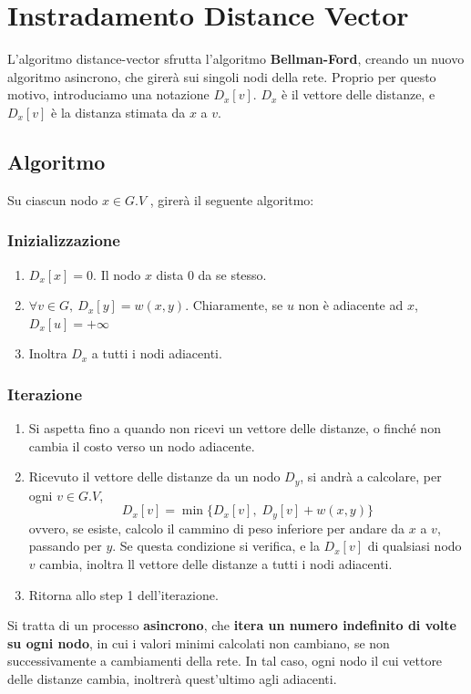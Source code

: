 \newpage

\section{Instradamento Distance Vector}
L'algoritmo distance-vector sfrutta l'algoritmo \textbf{Bellman-Ford}, creando un nuovo algoritmo asincrono, che girerà sui singoli nodi della rete. Proprio per questo motivo, introduciamo una notazione $D_x[v]$. $D_x$ è il vettore delle distanze, e $D_x[v]$ è la distanza stimata da $x$ a $v$.

\subsection{Algoritmo}
Su ciascun nodo $x \in G.V$ , girerà il seguente algoritmo:
\subsubsection{Inizializzazione}
\begin{enumerate}
	\item $D_x[x]=0$. Il nodo $x$ dista 0 da se stesso. 
	
	\item $\forall v \in G, \ D_x[y] =w (x,y)$. Chiaramente, se $u$ non è adiacente ad $x$, $D_x[u]= +\infty$
	
	\item Inoltra $D_x$ a tutti i nodi adiacenti.
\end{enumerate}

\subsubsection{Iterazione}
\begin{enumerate}
	\item Si aspetta fino a quando non ricevi un vettore delle distanze, o finché non cambia il costo verso un nodo adiacente.
	
	\item Ricevuto il vettore delle distanze da un nodo $D_y$, si andrà a calcolare, per ogni $v \in G.V$, 
	$$
	D_x[v] = \min \{D_x[v], \;D_y[v] + w(x,y)\}
	$$
	ovvero, se esiste, calcolo il cammino di peso inferiore per andare da $x$ a $v$, passando per $y$. Se questa condizione si verifica, e la $D_x[v]$ di qualsiasi nodo $v$ cambia, inoltra ll vettore delle distanze a tutti i nodi adiacenti.
	
	\item Ritorna allo step 1 dell'iterazione.
\end{enumerate}
Si tratta di un processo \textbf{asincrono}, che\textbf{ itera un numero indefinito di volte su ogni nodo}, in cui i valori minimi calcolati non cambiano, se non successivamente a cambiamenti della rete. In tal caso, ogni nodo il cui vettore delle distanze cambia, inoltrerà quest'ultimo agli adiacenti.


